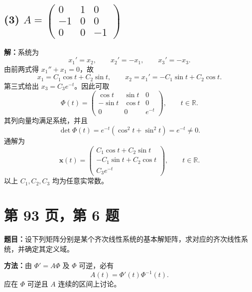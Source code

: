 \documentclass[11pt,a4paper]{ctexart}
\newcommand{\R}{\mathbb R}
\newcommand{\xx}{\boldsymbol{x}}
\begin{document}
\subsection*{(3) $\displaystyle A=\begin{pmatrix}0&1&0\\-1&0&0\\0&0&-1\end{pmatrix}$}
\textbf{解：}系统为
\[
x_1'=x_2,\qquad x_2'=-x_1,\qquad x_3'=-x_3.
\]
由前两式得 $x_1''+x_1=0$，故
\[
x_1=C_1\cos t+C_2\sin t,\qquad
x_2=x_1'=-C_1\sin t+C_2\cos t.
\]
第三式给出 $x_3=C_3e^{-t}$。因此可取
\[
\boxed{\Phi(t)=\begin{pmatrix}
\cos t&\sin t&0\\-\sin t&\cos t&0\\0&0&e^{-t}
\end{pmatrix},\qquad t\in\R.}
\]
其列向量均满足系统，并且
\[
\det\Phi(t)=e^{-t}(\cos^2t+\sin^2t)=e^{-t}\ne0.
\]
通解为
\[
\boxed{\xx(t)=\begin{pmatrix}
C_1\cos t+C_2\sin t\\-C_1\sin t+C_2\cos t\\C_3e^{-t}
\end{pmatrix},\qquad t\in\R.}
\]
以上 $C_1,C_2,C_3$ 均为任意实常数。

\newpage
\section*{第 93 页，第 6 题}
\textbf{题目：}设下列矩阵分别是某个齐次线性系统的基本解矩阵，求对应的齐次线性系统，并确定其定义域。

\textbf{方法：}由 $\Phi'=A\Phi$ 及 $\Phi$ 可逆，必有
\[
\boxed{A(t)=\Phi'(t)\Phi^{-1}(t).}
\]
应在 $\Phi$ 可逆且 $A$ 连续的区间上讨论。
\end{document}
